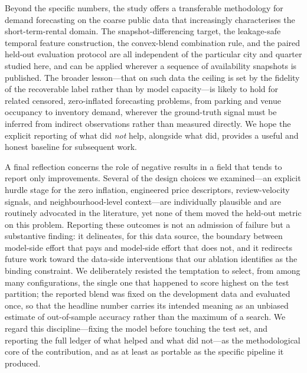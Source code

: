 \documentclass[review,12pt]{elsarticle}
\begin{document}
Beyond the specific numbers, the study offers a transferable methodology for
demand forecasting on the coarse public data that increasingly characterises the
short-term-rental domain. The snapshot-differencing target, the leakage-safe
temporal feature construction, the convex-blend combination rule, and the paired
held-out evaluation protocol are all independent of the particular city and
quarter studied here, and can be applied wherever a sequence of availability
snapshots is published. The broader lesson---that on such data the ceiling is set
by the fidelity of the recoverable label rather than by model capacity---is likely
to hold for related censored, zero-inflated forecasting problems, from parking and
venue occupancy to inventory demand, wherever the ground-truth signal must be
inferred from indirect observations rather than measured directly. We hope the
explicit reporting of what did \emph{not} help, alongside what did, provides a
useful and honest baseline for subsequent work.

A final reflection concerns the role of negative results in a field that tends to
report only improvements. Several of the design choices we examined---an explicit
hurdle stage for the zero inflation, engineered price descriptors, review-velocity
signals, and neighbourhood-level context---are individually plausible and are
routinely advocated in the literature, yet none of them moved the held-out metric
on this problem. Reporting these outcomes is not an admission of failure but a
substantive finding: it delineates, for this data source, the boundary between
model-side effort that pays and model-side effort that does not, and it redirects
future work toward the data-side interventions that our ablation identifies as the
binding constraint. We deliberately resisted the temptation to select, from among
many configurations, the single one that happened to score highest on the test
partition; the reported blend was fixed on the development data and evaluated once,
so that the headline number carries its intended meaning as an unbiased estimate of
out-of-sample accuracy rather than the maximum of a search. We regard this
discipline---fixing the model before touching the test set, and reporting the full
ledger of what helped and what did not---as the methodological core of the
contribution, and as at least as portable as the specific pipeline it produced.
\end{document}
